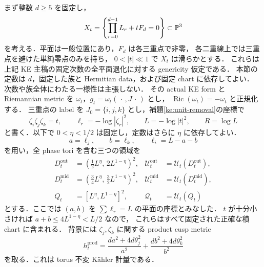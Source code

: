 まず整数 $d\ge5$ を固定し，
\[
 X_t=\left\{\prod_{r=0}^{d-1}L_r+tF_d=0\right\}\subset\mathbb P^3
\]
を考える．平面は一般位置にあり，$F_d$ は各三重点で非零，
各二重線上では三重点を避けた単純零点のみを持ち，
$0<|t|\ll1$ で $X_t$ は滑らかとする．
これらは上記 KE 主稿の固定次数の全平面退化に対する genericity 仮定である．
本節の定数は $d$，固定した族と Hermitian data，および固定 chart に依存してよい．
次数や族全体にわたる一様性は主張しない．
その actual KE form と Riemannian metric を
$\omega_t$，$g_t=\omega_t(\,\cdot\,,J\,\cdot\,)$ とし，
$\operatorname{Ric}(\omega_t)=-\omega_t$ と正規化する．
三重点の label を $J_0=\{i,j,k\}$ とし，補題\ref{ke:unit-removal}の座標で
\[
 \zeta_i\zeta_j\zeta_k=t,\qquad
 \ell_r=-\log|\zeta_r|^2,\qquad
 L=-\log|t|^2,\qquad R=\log L
\]
と書く．以下で $0<\eta<1/2$ は固定し，定数はさらに $\eta$ に依存してよい．
\[
 a=\ell_j,\qquad b=\ell_k,\qquad \ell_i=L-a-b
\]
を用い，全 phase tori を含む三つの領域を
\begin{align*}
 D_t^{\mathrm{out}}
   &=\left(\tfrac12L^\eta,\,2L^{1-\eta}\right)^2,
 &\mathcal U_t^{\mathrm{out}}&=\mathcal U_t(D_t^{\mathrm{out}}),\\
 D_t^{\mathrm{mid}}
   &=\left(\tfrac34L^\eta,\,\tfrac32L^{1-\eta}\right)^2,
 &\mathcal U_t^{\mathrm{mid}}&=\mathcal U_t(D_t^{\mathrm{mid}}),\\
 Q_t&=[L^\eta,L^{1-\eta}]^2,
 &\mathcal Q_t&=\mathcal U_t(Q_t)
\end{align*}
とする．ここでは $(a,b)$ を $\sum\ell_r=L$ の平面の座標とみなした．
$t$ が十分小さければ $a+b\le4L^{1-\eta}<L/2$ なので，
これらはすべて固定された正確な積 chart に含まれる．
背景には $\zeta_j,\zeta_k$ に関する product cusp metric
\begin{equation}\label{ke:eq:open-product-metric}
 h_t^{\mathrm{prod}}
 =\frac{da^2+4d\theta_j^2}{a^2}
  +\frac{db^2+4d\theta_k^2}{b^2}
\end{equation}
を取る．これは torus 不変 Kähler 計量である．


